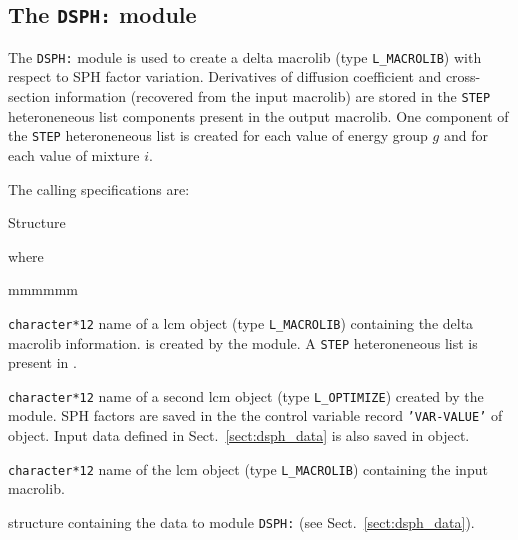\subsection{The {\tt DSPH:} module}

The {\tt DSPH:} module is used to create a delta {\sc macrolib} (type {\tt L\_MACROLIB}) with respect to SPH factor variation.
Derivatives of diffusion coefficient and cross-section information (recovered from the input {\sc macrolib}) are stored in the {\tt STEP} heteroneneous list components
present in the output {\sc macrolib}. One component of the {\tt STEP} heteroneneous list is created for each value of energy group $g$ and for each value of mixture $i$.

\vskip 0.08cm

The calling specifications are:

\begin{DataStructure}{Structure }
  \moc{:=}   \moc{::} 
\end{DataStructure}

\goodbreak
\noindent where

\begin{ListeDeDescription}{mmmmmm}

\item[\dusa{DMACRO}] {\tt character*12} name of a {\sc lcm} object (type {\tt L\_MACROLIB}) containing the delta {\sc macrolib}
information.  is created by the module. A {\tt STEP} heteroneneous list is present in .

\item[\dusa{OPTIM}] {\tt character*12} name of a second {\sc lcm} object (type {\tt L\_OPTIMIZE}) created by the module. SPH factors are saved
in the the control variable record {\tt 'VAR-VALUE'} of  object. Input data defined in Sect.~\ref{sect:dsph_data} is
also saved in  object.

\item[\dusa{MACRO}] {\tt character*12} name of the {\sc lcm} object (type {\tt L\_MACROLIB}) containing the input {\sc macrolib}.

\item[\dstr{dsph\_data}] structure containing the data to module {\tt DSPH:} (see Sect.~\ref{sect:dsph_data}).

\end{ListeDeDescription}

\vskip 0.2cm

